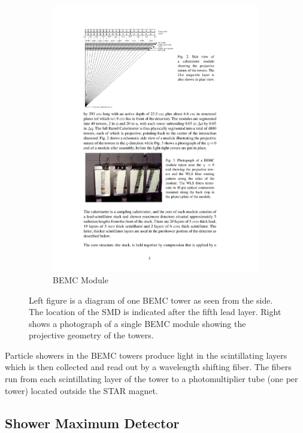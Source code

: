 \begin{figure}[htbp]
\begin{subfigure}{0.5\textwidth}
		\includegraphics[width=\textwidth]{Plots/Detector/BEMC_proj.pdf}
		\caption{BEMC Module}
		\label{fig:BEMC_towerb}
	\end{subfigure}
\caption[BEMC Towers]{Left figure is a diagram of one BEMC tower as seen from the side. The location of the SMD is indicated after the fifth lead layer. Right shows a photograph of a single BEMC module showing the projective geometry of the towers.}
\label{fig:BEMC_tower}
\end{figure}

Particle showers in the BEMC towers produce light in the scintillating layers which is then collected and read out by a wavelength shifting fiber. The fibers run from each scintillating layer of the tower to a photomultiplier tube (one per tower) located outside the STAR magnet.

\subsection{Shower Maximum Detector}

